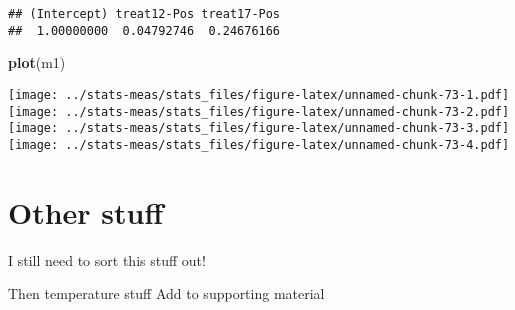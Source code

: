 \documentclass[
]{article}
\newenvironment{Shaded}{\begin{snugshade}}{\end{snugshade}}
\newcommand{\FunctionTok}[1]{\textcolor[rgb]{0.13,0.29,0.53}{\textbf{#1}}}
\newcommand{\NormalTok}[1]{#1}
\begin{document}
\begin{verbatim}
## (Intercept) treat12-Pos treat17-Pos 
##  1.00000000  0.04792746  0.24676166
\end{verbatim}

\begin{Shaded}
\begin{Highlighting}[]
\FunctionTok{plot}\NormalTok{(m1)}
\end{Highlighting}
\end{Shaded}

\texttt{[image: ../stats-meas/stats\_files/figure-latex/unnamed-chunk-73-1.pdf]}
\texttt{[image: ../stats-meas/stats\_files/figure-latex/unnamed-chunk-73-2.pdf]}
\texttt{[image: ../stats-meas/stats\_files/figure-latex/unnamed-chunk-73-3.pdf]}
\texttt{[image: ../stats-meas/stats\_files/figure-latex/unnamed-chunk-73-4.pdf]}

\section{Other stuff}\label{other-stuff}

I still need to sort this stuff out!

Then temperature stuff Add to supporting material
\end{document}
